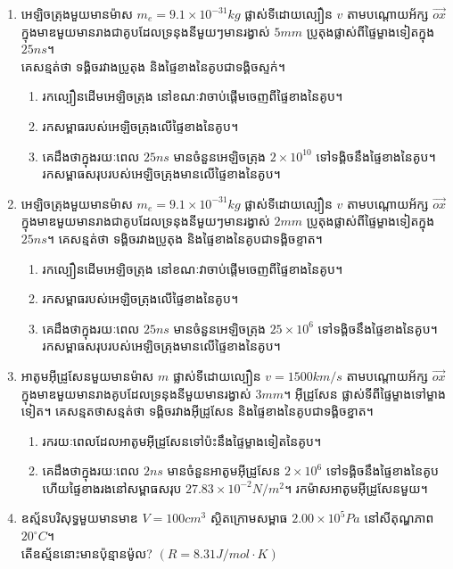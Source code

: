 \begin{enumerate}[m]
\begin{enumerate}[k]
	\end{enumerate}
	\item អេឡិចត្រុងមួយមានម៉ាស $m_{e}=9.1\times10^{-31}kg$ ផ្លាស់ទីដោយល្បឿន $v$ តាមបណ្តោយអ័ក្ស $\overrightarrow{ox}$ ក្នុងមាឌមួយមានរាងជាគូបដែលទ្រនុងនីមួយៗមានរង្វាស់ $5mm$ ប្រូតុងផ្លាស់ពីផ្ទៃម្ខាងទៀតក្នុង $25ns$។ \\គេសន្មត់ថា ទង្គិចរវាងប្រូតុង និងផ្ទៃខាងនៃគូបជាទង្គិចស្ទក់។
	\begin{enumerate}[k]
		\item រកល្បឿនដើមអេឡិចត្រុង នៅខណៈវាចាប់ផ្តើមចេញពីផ្ទៃខាងនៃគូប។
		\item រកសម្ពាធរបស់អេឡិចត្រុងលើផ្ទៃខាងនៃគូប។
		\item គេដឹងថាក្នុងរយៈពេល $25ns$ មានចំនួនអេឡិចត្រុង $2\times10^{10}$ ទៅទង្គិចនឹងផ្ទៃខាងនៃគូប។\\ រកសម្ពាធសរុបរបស់អេឡិចត្រុងមានលើផ្ទៃខាងនៃគូប។
	\end{enumerate}
	\item អេឡិចត្រុងមួយមានម៉ាស $m_{e}=9.1\times10^{-31}kg$ ផ្លាស់ទីដោយល្បឿន $v$ តាមបណ្តោយអ័ក្ស $\overrightarrow{ox}$ ក្នុងមាឌមួយមានរាងជាគូបដែលទ្រនុងនីមួយៗមានរង្វាស់ $2mm$ ប្រូតុងផ្លាស់ពីផ្ទៃម្ខាងទៀតក្នុង $25ns$។ គេសន្មត់ថា ទង្គិចរវាងប្រូតុង និងផ្ទៃខាងនៃគូបជាទង្គិចខ្ទាត។
	\begin{enumerate}[k]
		\item រកល្បឿនដើមអេឡិចត្រុង នៅខណៈវាចាប់ផ្តើមចេញពីផ្ទៃខាងនៃគូប។
		\item រកសម្ពាធរបស់អេឡិចត្រុងលើផ្ទៃខាងនៃគូប។
		\item គេដឹងថាក្នុងរយៈពេល $25ns$ មានចំនួនអេឡិចត្រុង $25\times10^{6}$ ទៅទង្គិចនឹងផ្ទៃខាងនៃគូប។\\ រកសម្ពាធសរុបរបស់អេឡិចត្រុងមានលើផ្ទៃខាងនៃគូប។
	\end{enumerate}
	\item អាតូមអុីដ្រូសែនមួយមានម៉ាស $m$ ផ្លាស់ទីដោយល្បឿន $v=1500km/s$ តាមបណ្តោយអ័ក្ស $\overrightarrow{ox}$ ក្នុងមាឌមួយមានរាងគូបដែលទ្រនុងនីមួយមានរង្វាស់ $3mm$។ អុីដ្រូសែន ផ្លាស់ទីពីផ្ទៃម្ខាងទៅម្ខាងទៀត។ គេសន្មតថាសន្មត់ថា ទង្គិចរវាងអុីដ្រូសែន និងផ្ទៃខាងនៃគូបជាទង្គិចខ្នាត។
	\begin{enumerate}[k]
		\item រករយៈពេលដែលអាតូមអុីដ្រូសែនទៅប៉ះនឹងផ្ទៃម្ខាងទៀតនៃគូប។
		\item គេដឹងថាក្នុងរយៈពេល $2ns$ មានចំនួនអាតូមអុីដ្រូសែន $2\times10^{6}$ ទៅទង្គិចនឹងផ្ទៃខាងនៃគូបហើយផ្ទៃខាងរងនៅសម្ពាធសរុប $27.83\times10^{-2}N/m^{2}$។ រកម៉ាសអាតូមអុីដ្រូសែនមួយ។
	\end{enumerate}
	\item ឧស្ម័នបរិសុទ្ធមួយមានមាឌ $V=100cm^{3}$ ស្ថិតក្រោមសម្ពាធ $2.00\times10^{5}Pa$ នៅសីតុណ្ហភាព $20^\circ C$។\\ តើឧស្ម័ននោះមានប៉ុន្មានម៉ូល? $\left(R=8.31J/mol\cdot K\right)$

\end{enumerate}
